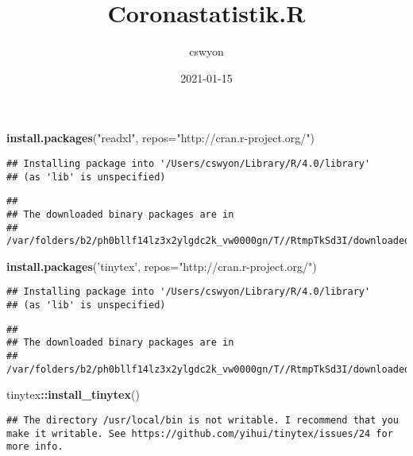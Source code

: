 \documentclass[
]{article}
\title{Coronastatistik.R}
\author{cswyon}
\date{2021-01-15}
\newenvironment{Shaded}{\begin{snugshade}}{\end{snugshade}}
\newcommand{\DataTypeTok}[1]{\textcolor[rgb]{0.13,0.29,0.53}{#1}}
\newcommand{\KeywordTok}[1]{\textcolor[rgb]{0.13,0.29,0.53}{\textbf{#1}}}
\newcommand{\NormalTok}[1]{#1}
\newcommand{\OperatorTok}[1]{\textcolor[rgb]{0.81,0.36,0.00}{\textbf{#1}}}
\newcommand{\StringTok}[1]{\textcolor[rgb]{0.31,0.60,0.02}{#1}}
\begin{document}
\maketitle

\begin{Shaded}
\begin{Highlighting}[]
\KeywordTok{install.packages}\NormalTok{(}\StringTok{"readxl"}\NormalTok{, }\DataTypeTok{repos=}\StringTok{"http://cran.r-project.org/"}\NormalTok{)}
\end{Highlighting}
\end{Shaded}

\begin{verbatim}
## Installing package into '/Users/cswyon/Library/R/4.0/library'
## (as 'lib' is unspecified)
\end{verbatim}

\begin{verbatim}
## 
## The downloaded binary packages are in
##  /var/folders/b2/ph0bllf14lz3x2ylgdc2k_vw0000gn/T//RtmpTkSd3I/downloaded_packages
\end{verbatim}

\begin{Shaded}
\begin{Highlighting}[]
\KeywordTok{install.packages}\NormalTok{(}\StringTok{'tinytex'}\NormalTok{, }\DataTypeTok{repos=}\StringTok{"http://cran.r-project.org/"}\NormalTok{)}
\end{Highlighting}
\end{Shaded}

\begin{verbatim}
## Installing package into '/Users/cswyon/Library/R/4.0/library'
## (as 'lib' is unspecified)
\end{verbatim}

\begin{verbatim}
## 
## The downloaded binary packages are in
##  /var/folders/b2/ph0bllf14lz3x2ylgdc2k_vw0000gn/T//RtmpTkSd3I/downloaded_packages
\end{verbatim}

\begin{Shaded}
\begin{Highlighting}[]
\NormalTok{tinytex}\OperatorTok{::}\KeywordTok{install_tinytex}\NormalTok{()}
\end{Highlighting}
\end{Shaded}

\begin{verbatim}
## The directory /usr/local/bin is not writable. I recommend that you make it writable. See https://github.com/yihui/tinytex/issues/24 for more info.
\end{verbatim}
\end{document}
